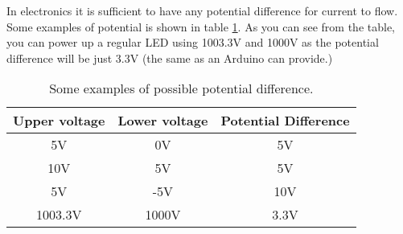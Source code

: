 \documentclass[../sparc.tex]{subfiles}
\begin{document}
In electronics it is sufficient to have any potential difference for current to
flow.  Some examples of potential is shown in table
\ref{table:electronics-potential-difference}.  As you can see from the table,
you can power up a regular LED using 1003.3V and 1000V as the potential
difference will be just 3.3V (the same as an Arduino can provide.)

\begin{table}[h]
  \centering
  \begin{tabular}{c | c | c}
    Upper voltage & Lower voltage & Potential Difference \\
    \hline
    5V & 0V & 5V \\
    \hline
    10V & 5V & 5V \\
    \hline
    5V & -5V & 10V \\
    \hline
    1003.3V & 1000V & 3.3V \\
    \hline
  \end{tabular}
  \caption{Some examples of possible potential difference.}
  \label{table:electronics-potential-difference}
\end{table}
\end{document}
